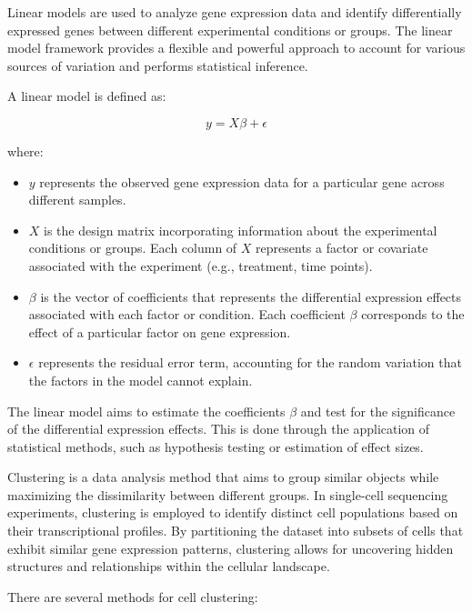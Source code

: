 \documentclass[aps,prb,twocolumn,superscriptaddress,floatfix,longbibliography]{revtex4-2}
\newif\ifptitle
\newif\ifpnumber
\newcounter{para}
\newcommand\ptitle[1]{\par\refstepcounter{para}
{\ifpnumber{\noindent\textcolor{lightgray}{\textbf{\thepara}}\indent}\fi}
{\ifptitle{\textbf{[{#1}]}}\fi}}
\begin{document}
\ptitle{Linear models} \cite{limma} Linear models are used to analyze gene expression data and identify differentially expressed genes between different experimental conditions or groups. The linear model framework provides a flexible and powerful approach to account for various sources of variation and performs statistical inference.

A linear model is defined as:

\begin{equation}
y = X\beta + \epsilon
\end{equation}

where:

\begin{itemize}
\item $y$ represents the observed gene expression data for a particular gene across different samples.
\item $X$ is the design matrix incorporating information about the experimental conditions or groups. Each column of $X$ represents a factor or covariate associated with the experiment (e.g., treatment, time points).
\item $\beta$  is the vector of coefficients that represents the differential expression effects associated with each factor or condition. Each coefficient $\beta$ corresponds to the effect of a particular factor on gene expression.
\item $\epsilon$ represents the residual error term, accounting for the random variation that the factors in the model cannot explain.
\end{itemize}

The linear model aims to estimate the coefficients $\beta$ and test for the significance of the differential expression effects. This is done through the application of statistical methods, such as hypothesis testing or estimation of effect sizes.

\ptitle{Cell clustering} \cite{clustering} Clustering is a data analysis method that aims to group similar objects while maximizing the dissimilarity between different groups. In single-cell sequencing experiments, clustering is employed to identify distinct cell populations based on their transcriptional profiles. By partitioning the dataset into subsets of cells that exhibit similar gene expression patterns, clustering allows for uncovering hidden structures and relationships within the cellular landscape.

There are several methods for cell clustering:
\end{document}
